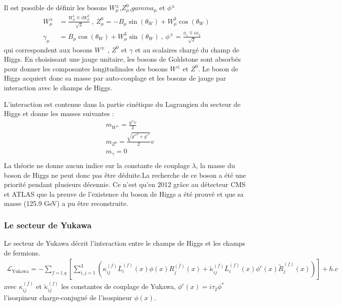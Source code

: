 Il est possible de définir les bosons $W_{\mu}^{\pm}$,$Z_{\mu}^{0}$,$gamma_{\mu}$ et $\phi^{\pm}$ 
\begin{equation}
\begin{split}
W_{\mu}^{\pm}&=\frac{W_{\mu}^{1}\mp iW_{\mu}^{2}}{\sqrt{2}}\ , \ Z_{\mu}^{0}=-B_{\mu}\sin(\theta_{W})+W_{\mu}^{3}\cos(\theta_{W})\\
\gamma_{\mu}&=B_{\mu}\cos(\theta_{W})+W_{\mu}^{3}\sin(\theta_{W})\ , \ \phi^{\pm}=\frac{\phi_{1}\mp i\phi_{2}}{\sqrt{2}}
\end{split}
\end{equation}
qui correspondent aux bosons $W^{\pm}$ , $Z^{0}$ et $\gamma$ et au scalaires chargé du champ de Higgs. En choisissant une jauge unitaire, les bosons de Goldstone sont absorbés pour donner les composantes longitudinales des bosons $W^{\pm}$ et $Z^{0}$. Le boson de Higgs acquiert donc sa masse par auto-couplage et les bosons de jauge par interaction avec le champs de Higgs.

L'interaction est contenue dans la partie cinétique du Lagrangien du secteur de Higgs et donne les masses suivantes : 
\begin{equation}
\begin{split}
\ &m_{W^{\pm}}=\frac{g''v}{2} \\
\ &m_{Z^{0}}=\frac{\sqrt{g''^{2}+g'^{1}}}{2}v \\
\ &m_{\gamma}=0 \\
\end{split}
\end{equation} 
La théorie ne donne aucun indice sur la constante de couplage $\lambda$, la masse du boson de Higgs ne peut donc pas être déduite.La recherche de ce boson a été une priorité pendant plusieurs décennie. Ce n'est qu'en 2012 grâce au détecteur CMS et ATLAS que la preuve de l'existence du boson de Higgs a été prouvé et que sa masse (125.9 GeV) a pu être reconstruite. 

\subsubsection{Le secteur de Yukawa}
Le secteur de Yukawa décrit l'interaction entre le champs de Higgs et les champs de fermions.
\begin{equation}
\begin{split}
\mathcal{L}_{\mathrm{Yukawa}}=-\sum_{f=l,q}\left[\sum_{i,j=1}^{3}\left(\kappa_{ij}^{(f)}\bar{L}_{i}^{(f)}(x)\phi(x)R_{j}^{(f)}(x)+\tilde{\kappa}_{ij}^{(f)}\bar{L}_{i}^{(f)}(x)\phi^{c}(x)\tilde{R}_{j}^{(f)}(x)\right)\right]+ h.c
\end{split}
\end{equation} 
avec $\kappa_{ij}^{(f)}$ et $\tilde{\kappa}_{ij}^{(f)}$ les constantes de couplage de Yukawa, $\phi^{c}(x)=i\tau_{2}\phi^{*}$ l'isospineur charge-conjugué de l'isospineur $\phi(x)$.

